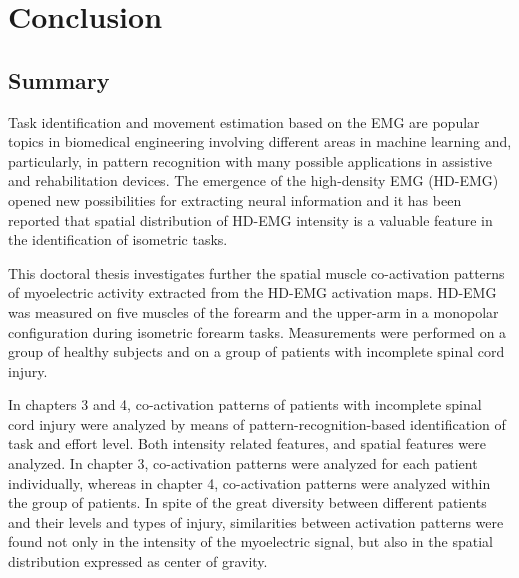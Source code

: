 \chapter{Conclusion}
\label{ch:conclusions}


\section{Summary}

Task identification and movement estimation based on the EMG are popular topics in biomedical engineering involving different areas in machine learning and, particularly, in pattern recognition with many possible applications in assistive and rehabilitation devices. The emergence of the high-density EMG (HD-EMG) opened new possibilities for extracting neural information and it has been reported that spatial distribution of HD-EMG intensity is a valuable feature in the identification of isometric tasks.

This doctoral thesis investigates further the spatial muscle co-activation patterns of myoelectric activity extracted from the HD-EMG activation maps. HD-EMG was measured on five muscles of the forearm and the upper-arm in a monopolar configuration during isometric forearm tasks. Measurements were performed on a group of healthy subjects and on a group of patients with incomplete spinal cord injury.

In chapters 3 and 4, co-activation patterns of patients with incomplete spinal cord injury were analyzed by means of pattern-recognition-based identification of task and effort level. Both intensity related features, and spatial features were analyzed. In chapter 3, co-activation patterns were analyzed for each patient individually, whereas in chapter 4, co-activation patterns were analyzed within the group of patients. In spite of the great diversity between different patients and their levels and types of injury, similarities between activation patterns were found not only in the intensity of the myoelectric signal, but also in the spatial distribution expressed as center of gravity.

